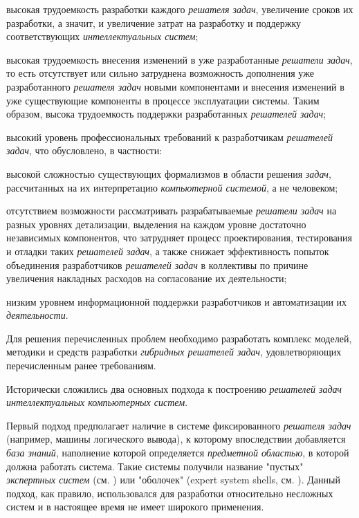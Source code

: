 \begin{textitemize}
\item высокая трудоемкость разработки каждого \textit{решателя задач}, увеличение сроков их разработки, а значит, и увеличение затрат на разработку и поддержку соответствующих \textit{интеллектуальных систем};
\item высокая трудоемкость внесения изменений в уже разработанные \textit{решатели задач}, то есть отсутствует или сильно затруднена возможность дополнения уже разработанного \textit{решателя задач} новыми компонентами и внесения изменений в уже существующие компоненты в процессе эксплуатации системы. Таким образом, высока трудоемкость поддержки разработанных \textit{решателей задач};
\item высокий уровень профессиональных требований к разработчикам \textit{решателей задач}, что обусловлено, в частности:
	\begin{textitemize}
	\item высокой сложностью существующих формализмов в области решения \textit{задач}, рассчитанных на их интерпретацию \textit{компьютерной системой}, а не человеком;
	\item отсутствием возможности рассматривать разрабатываемые \textit{решатели задач} на разных уровнях детализации, выделения на каждом уровне достаточно независимых компонентов, что затрудняет процесс проектирования, тестирования и отладки таких \textit{решателей задач}, а также снижает эффективность попыток объединения разработчиков \textit{решателей задач} в коллективы по причине увеличения накладных расходов на согласование их деятельности;
	\item низким уровнем информационной поддержки разработчиков и автоматизации их \textit{деятельности}.
\end{textitemize}
\end{textitemize}

Для решения перечисленных проблем необходимо разработать комплекс моделей, методики и средств разработки \textit{гибридных решателей задач}, удовлетворяющих перечисленным ранее требованиям.

Исторически сложились два основных подхода к построению \textit{решателей задач} \textit{интеллектуальных компьютерных систем}.

Первый подход предполагает наличие в системе фиксированного \textit{решателя задач} (например, машины логического вывода), к которому впоследствии добавляется \textit{база знаний}, наполнение которой определяется \textit{предметной областью}, в которой должна работать система. Такие системы получили название "пустых"{} \textit{экспертных систем} (см. ) или "оболочек"{} (expert system shells, см. ). Данный подход, как правило, использовался для разработки относительно несложных систем и в настоящее время не имеет широкого применения.

